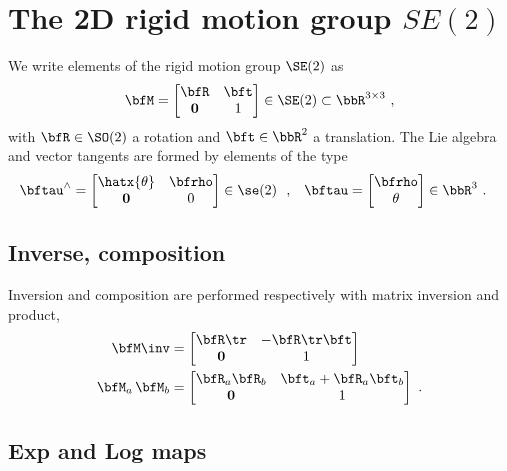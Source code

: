 

\section{The 2D rigid motion group $SE(2)$}
\label{sec:SE2}


We write elements of the rigid motion group $\SE(2)$ as 
%
\begin{align}
\bfM= \begin{bmatrix}
\bfR & \bft \\ \bf0 & 1
\end{bmatrix} \in \SE(2) \subset \bbR^{3\times3}
~,
\end{align}
%
with $\bfR\in\SO(2)$ a rotation and $\bft\in\bbR^2$ a translation.
The Lie algebra and vector tangents are formed by elements of the type
%
\begin{align} 
\bftau^\wedge
  &= \begin{bmatrix}\hatx{\theta} & \bfrho \\ \bf0 & 0\end{bmatrix} \in \se(2)
  ~~,
& 
\bftau
  &= \begin{bmatrix}\bfrho \\ \theta\end{bmatrix}\in\bbR^3 
~.
\end{align}
%

\subsection{Inverse, composition}

Inversion and composition are performed respectively with matrix inversion and product,
%
\begin{align}
\bfM\inv &= \begin{bmatrix}
\bfR\tr & -\bfR\tr\bft \\ \bf0 & 1
\end{bmatrix} 
\\
\bfM_a\,\bfM_b &= \begin{bmatrix}
\bfR_a\bfR_b & \bft_a+\bfR_a\bft_b \\ \bf0 & 1
\end{bmatrix} 
~.
\end{align}

\subsection{Exp and Log maps}

